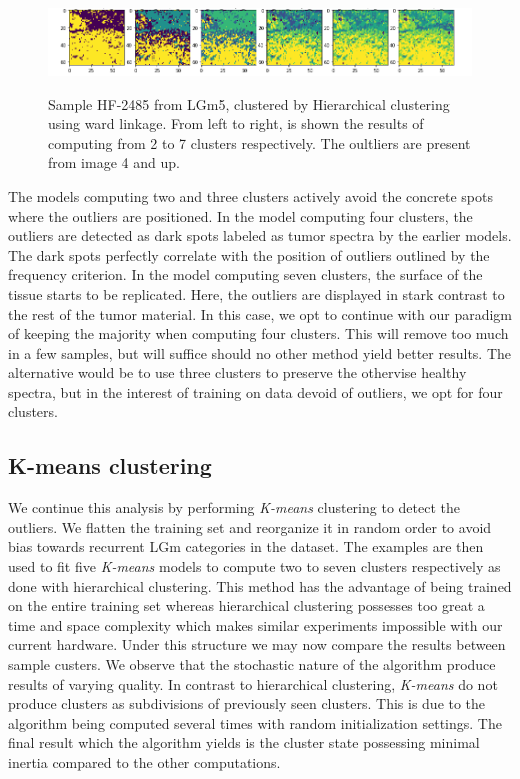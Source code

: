 \begin{figure}[h]

    \centering
{\includegraphics[width=15cm]{images/Ward_linkage/LGm-5/HF-2485_V1B_1.h5_9.png} }
\caption{Sample HF-2485 from LGm5, clustered by Hierarchical clustering using ward linkage. From left to right, is shown the results of computing from 2 to 7 clusters respectively. The oultliers are present from image 4 and up.
\label{fig:hf_2485}}%
\end{figure}

The models computing two and three clusters actively avoid the concrete spots where the outliers are positioned. In the model computing four clusters, the outliers are detected as dark spots labeled as tumor spectra by the earlier models. The dark spots perfectly correlate with the position of outliers outlined by the frequency criterion. In the model computing seven clusters, the surface of the tissue starts to be replicated. Here, the outliers are displayed in stark contrast to the rest of the tumor material. In this case, we opt to continue with our paradigm of keeping the majority when computing four clusters. This will remove too much in a few samples, but will suffice should no other method yield better results. The alternative would be to use three clusters to preserve the othervise healthy spectra, but in the interest of training on data devoid of outliers, we opt for four clusters.

\subsection{K-means clustering}

We continue this analysis by performing \textit{K-means} clustering to detect the outliers. We flatten the training set and reorganize it in random order to avoid bias towards recurrent LGm categories in the dataset. The examples are then used to fit five \textit{K-means} models to compute two to seven clusters respectively as done with hierarchical clustering. This method has the advantage of being trained on the entire training set whereas hierarchical clustering possesses too great a time and space complexity which makes similar experiments impossible with our current hardware. Under this structure we may now compare the results between sample custers. We observe that the stochastic nature of the algorithm produce results of varying quality. In contrast to hierarchical clustering, \textit{K-means} do not produce clusters as subdivisions of previously seen clusters. This is due to the algorithm being computed several times with random initialization settings. The final result which the algorithm yields is the cluster state possessing minimal inertia compared to the other computations.

